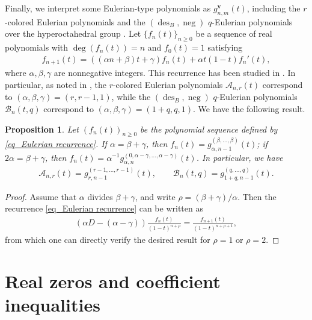 \documentclass[12pt]{article}
\newtheorem{prop}[thm]{Proposition}
\numberwithin{equation}{section}
\begin{document}
Finally, we interpret some Eulerian-type polynomials as $g^{\mathbf v}_{n,m}(t)$, including the $r$-colored Eulerian polynomials \cite{Steingrimsson-1994} and the $(\operatorname{des}_B,\operatorname{neg})$
$q$-Eulerian polynomials over the hyperoctahedral group \cite{Brenti-1994}. Let $\{f_n(t)\}_{n\ge0}$ be a sequence of real polynomials with $\deg(f_n(t))=n$ and $f_0(t)=1$ satisfying
\begin{align}\label{eq_Eulerian recurrence}
f_{n+1}(t)=((\alpha n+\beta)t+\gamma)f_n(t)+\alpha t(1-t)f_n'(t),
\end{align}
where $\alpha,\beta,\gamma$ are nonnegative integers. This recurrence has been studied in
\cite{Liu-Liu-Ma-Zhang-2025}. In particular, as noted in \cite[Sections 3.2 and 3.3]{Liu-Liu-Ma-Zhang-2025}, the $r$-colored Eulerian polynomials $\mathcal{A}_{n,r}(t)$ correspond to $(\alpha,\beta,\gamma)=(r,r-1,1)$, while the $(\operatorname{des}_B,\operatorname{neg})$ $q$-Eulerian polynomials $\mathcal{B}_n(t,q)$ correspond to $(\alpha,\beta,\gamma)=(1+q,q,1)$. We have the following result. 
\begin{prop}\label{eq-eulerianpol-operator} 
Let $(f_n(t))_{n\ge 0}$ be the polynomial sequence defined by \eqref{eq_Eulerian recurrence}. If $\alpha=\beta+\gamma$, then 
$f_n(t)=g^{(\beta,\ldots,\beta)}_{\alpha,n-1}(t)$; if $2\alpha=\beta+\gamma$, then $f_n(t)=\alpha^{-1}g^{(0,\alpha-\gamma,\ldots,\alpha-\gamma)}_{\alpha,n}(t)$. 
In particular, we have 
\begin{align}\label{eq-AB-interpret}
 \mathcal{A}_{n,r}(t)=g^{(r-1,\ldots,r-1)}_{r,n-1}(t),\qquad \mathcal{B}_n(t,q)=g^{(q,\ldots,q)}_{1+q,n-1}(t).   
\end{align}
\end{prop}
\begin{proof}
Assume that $\alpha$ divides $\beta+\gamma$, and write $\rho=(\beta+\gamma)/\alpha$. Then the recurrence 
\eqref{eq_Eulerian recurrence} can be written as
\begin{align*}
 (\alpha D-(\alpha-\gamma))\frac{f_n(t)}{(1-t)^{n+\rho}}=\frac{f_{n+1}(t)}{(1-t)^{n+\rho+1}},  
\end{align*}
from which one can directly verify the desired result for $\rho=1$ or $\rho=2$. 
\end{proof}

\section{Real zeros and coefficient inequalities}\label{sec 4}
\end{document}

